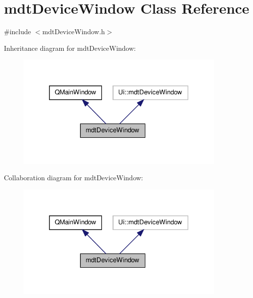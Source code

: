 \hypertarget{classmdt_device_window}{\section{mdt\-Device\-Window Class Reference}
\label{classmdt_device_window}
}


{\ttfamily \#include $<$mdt\-Device\-Window.\-h$>$}



Inheritance diagram for mdt\-Device\-Window\-:
\nopagebreak
\begin{figure}[H]
\begin{center}
\leavevmode
\includegraphics[width=292pt]{classmdt_device_window__inherit__graph}
\end{center}
\end{figure}


Collaboration diagram for mdt\-Device\-Window\-:
\nopagebreak
\begin{figure}[H]
\begin{center}
\leavevmode
\includegraphics[width=292pt]{classmdt_device_window__coll__graph}
\end{center}
\end{figure}
